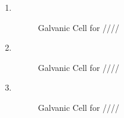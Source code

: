 \documentclass[12pt]{article}
\begin{document}
\begin{enumerate}
\begin{enumerate}
      \item \textbf{ }\\

        \begin{center}
          \begin{figure}[h!]
            \centering
            
            \caption{Galvanic Cell for ////}
            \label{fig:3}
          \end{figure}
        \end{center}

        \newpage

      \item \textbf{ }\\

        \begin{center}
          \begin{figure}[h!]
            \centering
            
            \caption{Galvanic Cell for ////}
            \label{fig:4}
          \end{figure}
        \end{center}

        \newpage

      \item \textbf{ }\\

        \begin{center}
          \begin{figure}[h!]
            \centering
            
            \caption{Galvanic Cell for ////}
            \label{fig:5}
          \end{figure}
        \end{center}

    \end{enumerate}

\end{enumerate}
\end{document}
